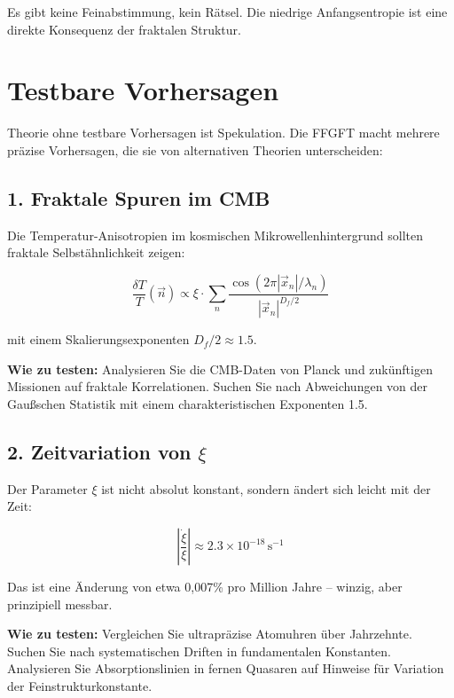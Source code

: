 	Es gibt keine Feinabstimmung, kein Rätsel. Die niedrige Anfangsentropie ist eine direkte Konsequenz der fraktalen Struktur.
	
	\section{Testbare Vorhersagen}
	
	Theorie ohne testbare Vorhersagen ist Spekulation. Die FFGFT macht mehrere präzise Vorhersagen, die sie von alternativen Theorien unterscheiden:
	
	\subsection{1. Fraktale Spuren im CMB}
	
	Die Temperatur-Anisotropien im kosmischen Mikrowellenhintergrund sollten fraktale Selbstähnlichkeit zeigen:
	
	\begin{equation}
		\frac{\delta T}{T}(\vec{n}) \propto \xi \cdot \sum_{n} \frac{\cos(2\pi |\vec{x}_n|/\lambda_n)}{|\vec{x}_n|^{D_f/2}}
	\end{equation}
	
	mit einem Skalierungsexponenten $D_f/2 \approx 1.5$.
	
	\textbf{Wie zu testen:} Analysieren Sie die CMB-Daten von Planck und zukünftigen Missionen auf fraktale Korrelationen. Suchen Sie nach Abweichungen von der Gaußschen Statistik mit einem charakteristischen Exponenten 1.5.
	
	\subsection{2. Zeitvariation von $\xi$}
	
	Der Parameter $\xi$ ist nicht absolut konstant, sondern ändert sich leicht mit der Zeit:
	
	\begin{equation}
		\left|\frac{\dot{\xi}}{\xi}\right| \approx 2.3 \times 10^{-18} \, \text{s}^{-1}
	\end{equation}
	
	Das ist eine Änderung von etwa 0{,}007\% pro Million Jahre -- winzig, aber prinzipiell messbar.
	
	\textbf{Wie zu testen:} Vergleichen Sie ultrapräzise Atomuhren über Jahrzehnte. Suchen Sie nach systematischen Driften in fundamentalen Konstanten. Analysieren Sie Absorptionslinien in fernen Quasaren auf Hinweise für Variation der Feinstrukturkonstante.
	
